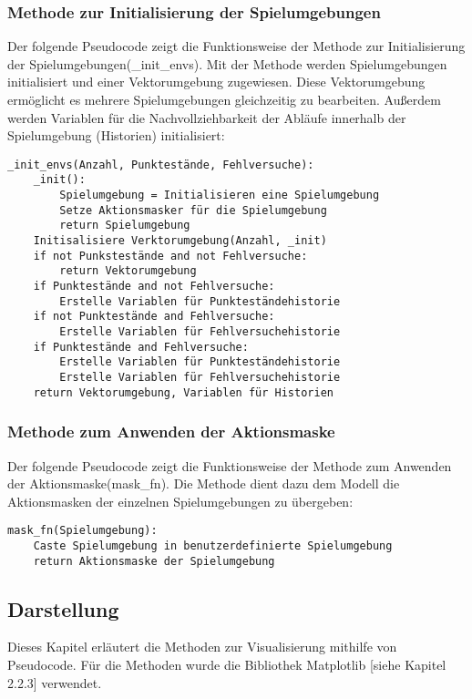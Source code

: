 \subsubsection{Methode zur Initialisierung der Spielumgebungen}
\begin{minipage}{\linewidth}
Der folgende Pseudocode zeigt die Funktionsweise der Methode zur Initialisierung der Spielumgebungen(\_init\_envs). Mit der Methode werden Spielumgebungen initialisiert und einer Vektorumgebung zugewiesen. Diese Vektorumgebung ermöglicht es mehrere Spielumgebungen gleichzeitig zu bearbeiten. Außerdem werden Variablen für die Nachvollziehbarkeit der Abläufe innerhalb der Spielumgebung (Historien) initialisiert:
\vspace{0.5cm}
\begin{lstlisting}[caption={Methode zur Initialisierung der Spielumgebungen}]
_init_envs(Anzahl, Punktestände, Fehlversuche):
	_init():
		Spielumgebung = Initialisieren eine Spielumgebung
		Setze Aktionsmasker für die Spielumgebung
		return Spielumgebung
	Initisalisiere Verktorumgebung(Anzahl, _init)
	if not Punkstestände and not Fehlversuche:
		return Vektorumgebung
	if Punktestände and not Fehlversuche:
		Erstelle Variablen für Punkteständehistorie
	if not Punktestände and Fehlversuche:
		Erstelle Variablen für Fehlversuchehistorie
	if Punktestände and Fehlversuche:
		Erstelle Variablen für Punkteständehistorie
		Erstelle Variablen für Fehlversuchehistorie
	return Vektorumgebung, Variablen für Historien
\end{lstlisting}
\end{minipage}

\subsubsection{Methode zum Anwenden der Aktionsmaske}
\begin{minipage}{\linewidth}
Der folgende Pseudocode zeigt die Funktionsweise der Methode zum Anwenden der Aktionsmaske(mask\_fn). Die Methode dient dazu dem Modell die Aktionsmasken der einzelnen Spielumgebungen zu übergeben:
\vspace{0.5cm}
\begin{lstlisting}[caption={Methode zum Anwenden der Aktionsmaske}]
mask_fn(Spielumgebung):
	Caste Spielumgebung in benutzerdefinierte Spielumgebung
	return Aktionsmaske der Spielumgebung
\end{lstlisting}
\end{minipage}

\subsection{Darstellung}
Dieses Kapitel erläutert die Methoden zur Visualisierung mithilfe von Pseudocode. Für die Methoden wurde die Bibliothek Matplotlib [siehe Kapitel 2.2.3] verwendet.
